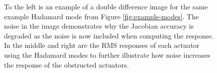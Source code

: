 \documentclass[12pt]{spieman}  %
\begin{document}
\begin{spacing}{2}
\begin{figure}[h]
    \centering
    \caption{To the left is an example of a double difference image for the same example Hadamard mode from Figure \ref{fig:example-modes}. The noise in the image demonstrates why the Jacobian accuracy is degraded as the noise is now included when computing the response. In the middle and right are the RMS responses of each actuator using the Hadamard modes to further illustrate how noise increases the response of the obstructed actuators.}
    \label{fig:noisy-responses}
\end{figure}


\end{spacing}
\end{document}
